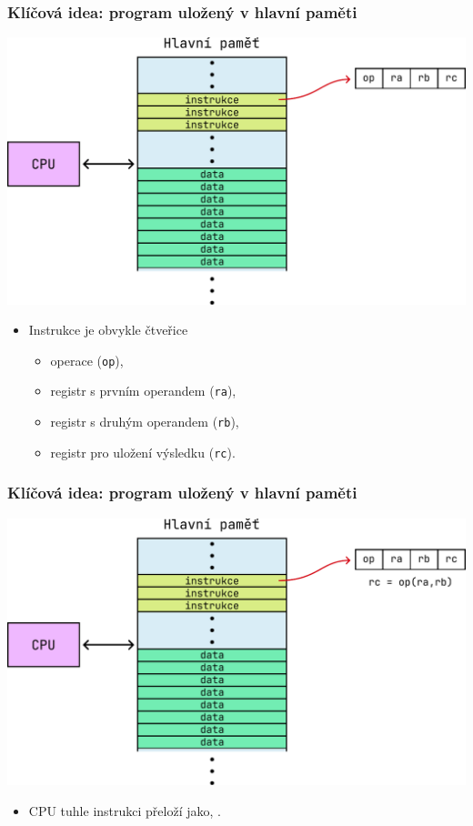 \documentclass[aspectratio=169,11pt,svgnames]{beamer}
\begin{document}
\begin{frame}
 \frametitle{Klíčová idea: program uložený v hlavní paměti}
 \begin{center}
  \includegraphics[width=.5\textwidth]{instructions-2.pdf}
 \end{center}
 \vspace*{-3em}
 \begin{itemize}[label=\textbullet]
  \item \alert{Instrukce} je obvykle čtveřice
  \begin{itemize}[label=\textemdash]
   \item operace (\texttt{op}),
   \item registr s prvním operandem (\texttt{ra}),
   \item registr s druhým operandem (\texttt{rb}),
   \item registr pro uložení výsledku (\texttt{rc}).
  \end{itemize}
 \end{itemize}
\end{frame}

\begin{frame}
 \frametitle{Klíčová idea: program uložený v hlavní paměti}
 \begin{center}
  \includegraphics[width=.5\textwidth]{instructions-3.pdf}
 \end{center}
 \vspace*{-1em}
 \begin{itemize}[label=\textbullet]
  \item CPU tuhle instrukci přeloží jako, .
 \end{itemize}
\end{frame}
\end{document}
